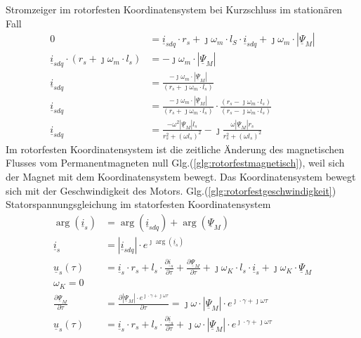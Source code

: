 Stromzeiger im rotorfesten Koordinatensystem bei Kurzschluss im stationären Fall
\begin{align}
	0 &= \underline{i}_{sdq} \cdot r_s + \jmath \omega_m \cdot l_S \cdot \underline{i}_{sdq} + \jmath \omega_m \cdot |\underline{\Psi}_M|\\
	\underline{i}_{sdq} \cdot (r_s + \jmath \omega_m \cdot l_s) & =  - \jmath \omega_m \cdot |\underline{\Psi}_M|\\
	\underline{i}_{sdq}  & =  \frac{- \jmath \omega_m \cdot |\underline{\Psi}_M|}{(r_s + \jmath \omega_m \cdot l_s)}\\
	\underline{i}_{sdq}  & =  \frac{- \jmath \omega_m \cdot |\underline{\Psi}_{M}|}{(r_s + \jmath \omega_m \cdot l_s)} \cdot \frac{(r_s - \jmath \omega_m \cdot l_s)}{(r_s - \jmath \omega_m \cdot l_s)}\\
	\underline{i}_{sdq}  & = \frac{-\omega^2 |\underline{\Psi}_M| l_s}{r_s^2 + (\omega l_s)^2} -\jmath \frac{\omega |\underline{\Psi}_M| r_s}{r_s^2 + (\omega l_s)^2}\label{glg:stromzeiger rotorfest ks}
\end{align}
Im rotorfesten Koordinatensystem ist die zeitliche Änderung des magnetischen Flusses vom Permanentmagneten null Glg.(\ref{glg:rotorfestmagnetisch}), weil  sich der Magnet mit dem Koordinatensystem bewegt. Das Koordinatensystem bewegt sich mit der Geschwindigkeit des Motors. Glg.(\ref{glg:rotorfestgeschwindigkeit})\\ 
Statorspannungsgleichung im statorfesten Koordinatensystem
\begin{align}
	\arg(\underline{i}_s) &= \arg(\underline{i}_{sdq}) + \arg(\underline{\Psi}_M)\\
	\underline{i}_s &= |\underline{i}_{sdq}| \cdot e^{\jmath \arg(\underline{i}_{s})}\\
	\underline{u}_s(\tau) &= \underline{i}_s \cdot r_s + l_s \cdot \frac{\partial \underline{i}_s}{\partial \tau} + \frac{\partial \underline{\Psi}_M}{\partial \tau} + \jmath \omega_K \cdot l_s \cdot \underline{i}_s + \jmath \omega_K \cdot \underline{\Psi}_M \\
	\omega_K=0 \label{glg:statorfest} \\
	\frac{\partial \underline{\Psi}_M}{\partial \tau} &= \frac{\partial |\underline{\Psi}_M | \cdot e^{\jmath \cdot \gamma + \jmath \omega \tau}}{\partial \tau} = \jmath\omega \cdot|\underline{\Psi}_M | \cdot e^{\jmath \cdot \gamma + \jmath \omega \tau}\\
	\underline{u}_s(\tau) &= \underline{i}_s \cdot r_s + l_s \cdot \frac{\partial \underline{i}_s}{\partial \tau} + \jmath\omega \cdot|\underline{\Psi}_M | \cdot e^{\jmath \cdot \gamma + \jmath \omega \tau} \label{glg:spannungraumzeiger rotor}
\end{align}

